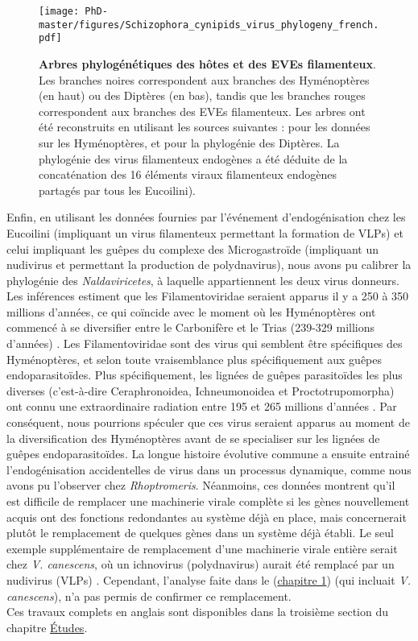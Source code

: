 \begin{figure}[!htpbt]
\texttt{[image: PhD-master/figures/Schizophora\_cynipids\_virus\_phylogeny\_french.pdf]}\centering
\caption[Paper3:Arbres phylogénétiques des Eucoilini et des EVEs filamenteux]{\textbf{Arbres phylogénétiques des hôtes et des EVEs filamenteux}. Les branches noires correspondent aux branches des Hyménoptères (en haut) ou des Diptères (en bas), tandis que les branches rouges correspondent aux branches des EVEs filamenteux. Les arbres ont été reconstruits en utilisant les sources suivantes :\citep{blaimer_comprehensive_2020} pour les données sur les Hyménoptères, et \citep{wiegmann_episodic_2011} pour la phylogénie des Diptères. La phylogénie des virus filamenteux endogènes a été déduite de la concaténation des 16 éléments viraux filamenteux endogènes partagés par tous les Eucoilini).}
\label{figure:Schizophora_Eucoilini_virus_phylogeny_french}
\end{figure}

\newpage
Enfin, en utilisant les données fournies par l'événement d'endogénisation chez les Eucoilini (impliquant un virus filamenteux permettant la formation de VLPs) et celui impliquant les guêpes du complexe des Microgastroïde (impliquant un nudivirus et permettant la production de  polydnavirus), nous avons pu calibrer la phylogénie des \textit{Naldaviricetes}, à laquelle appartiennent les deux virus donneurs. Les inférences estiment que les Filamentoviridae seraient apparus il y a 250 à 350 millions d'années, ce qui coïncide avec le moment où les Hyménoptères ont commencé à se diversifier entre le Carbonifère et le Trias (239-329 millions d'années) \citep{peters_evolutionary_2017}. Les Filamentoviridae sont des virus qui semblent être spécifiques des Hyménoptères, et selon toute vraisemblance plus spécifiquement aux guêpes endoparasitoïdes. Plus spécifiquement, les lignées de guêpes parasitoïdes les plus diverses (c'est-à-dire Ceraphronoidea, Ichneumonoidea et Proctotrupomorpha) ont connu une extraordinaire radiation entre 195 et 265 millions d'années \citep{peters_evolutionary_2017}. Par conséquent, nous pourrions spéculer que ces virus seraient apparus au moment de la diversification des Hyménoptères avant de se specialiser sur les lignées de guêpes endoparasitoïdes. La longue histoire évolutive commune a ensuite entrainé l'endogénisation accidentelles de virus dans un processus dynamique, comme nous avons pu l'observer chez  \textit{Rhoptromeris}. Néanmoins, ces données montrent qu'il est difficile de remplacer une machinerie virale complète si les gènes nouvellement acquis ont des fonctions redondantes au système déjà en place, mais concernerait plutôt le remplacement de quelques gènes dans un système déjà établi.  Le seul exemple supplémentaire de remplacement d'une machinerie virale entière serait chez \textit{V. canescens}, où un ichnovirus (polydnavirus) aurait été remplacé par un nudivirus (VLPs) \citep{pichon_recurrent_2015}. Cependant, l'analyse faite dans le (\hyperref[sec:chap1]{chapitre 1}) (qui incluait \textit{V. canescens}), n'a pas permis de confirmer ce remplacement.\\

Ces travaux complets en anglais sont disponibles dans la troisième section du chapitre \hyperref[sec:chap3]{Études}. 


